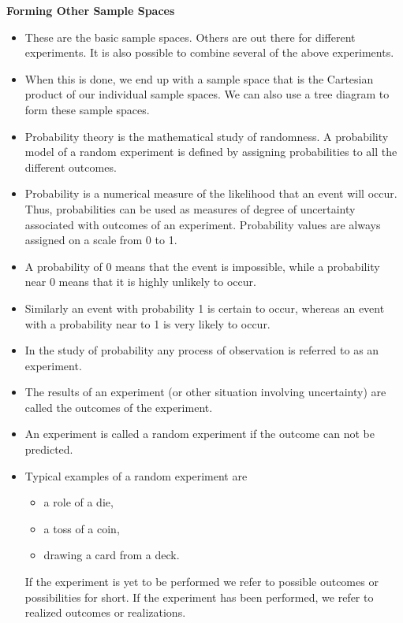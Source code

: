 \documentclass[12pt]{report}
\begin{document}
{ \Large
	\textbf{Forming Other Sample Spaces}
	
	\begin{itemize}
		\item These are the basic sample spaces. Others are out there for different experiments. It is also possible to combine several of the above experiments. 
		\item When this is done, we end up with a sample space that is the Cartesian product of our individual sample spaces. We can also use a tree diagram to form these sample spaces.
	\end{itemize}
	
	
}
{ \Large
	\begin{itemize}
		\item Probability theory is the mathematical study of randomness. A
		probability model of a random experiment is defined by assigning
		probabilities to all the different outcomes.
		\item Probability is a numerical measure of the likelihood that an event will
		occur. Thus, probabilities can be used as measures of degree of
		uncertainty associated with outcomes of an experiment.
		Probability values are always assigned on a scale from 0 to 1.
		\item A probability of 0 means that the event is impossible, while
		a probability near 0 means that it is highly unlikely to occur.
		\item Similarly an event with probability 1 is certain to occur, whereas an
		event with a probability near to 1 is very likely to occur.
	\end{itemize}
	
}
{ \Large
	\begin{itemize}
		\item In the study of probability any process of observation is referred to as an
		experiment.
		\item The results of an experiment (or other situation involving uncertainty)
		are called the outcomes of the experiment.
		\item An experiment is called a random experiment if the outcome can not be
		predicted.
		\item Typical examples of a random experiment are
		\begin{itemize}
			\item a role of a die,
			\item a toss of a coin,
			\item drawing a card from a deck.
		\end{itemize}If the experiment is yet to be performed we refer to possible outcomes
		or possibilities for short. If the experiment has been performed, we
		refer to realized outcomes or realizations.
	\end{itemize}
}
\end{document}
